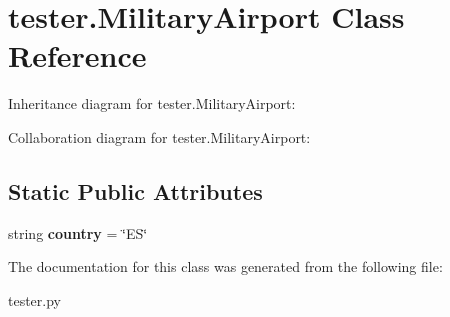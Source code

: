 \hypertarget{classtester_1_1_military_airport}{}\section{tester.\+Military\+Airport Class Reference}
\label{classtester_1_1_military_airport}


Inheritance diagram for tester.\+Military\+Airport\+:


Collaboration diagram for tester.\+Military\+Airport\+:
\subsection*{Static Public Attributes}
\begin{DoxyCompactItemize}
\item 
\mbox{\label{classtester_1_1_military_airport_a50d9061d97f8951926da9a67ac698363}} 
string {\bfseries country} = \char`\"{}ES\char`\"{}
\end{DoxyCompactItemize}


The documentation for this class was generated from the following file\+:\begin{DoxyCompactItemize}
\item 
tester.\+py\end{DoxyCompactItemize}
